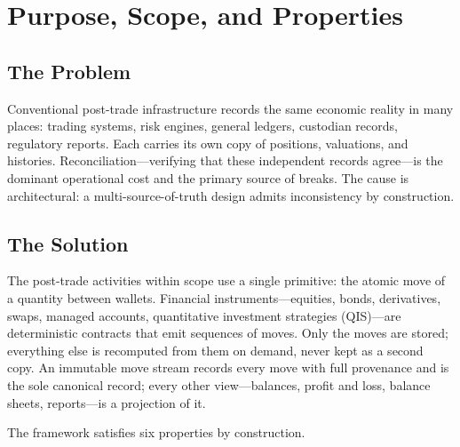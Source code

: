 \section{Purpose, Scope, and Properties}
\label{sec:sec01}
\label{sec:intro}

\subsection{The Problem}

Conventional post-trade infrastructure records the same economic reality in many places: trading systems, risk engines, general ledgers, custodian records, regulatory reports. Each carries its own copy of positions, valuations, and histories. Reconciliation---verifying that these independent records agree---is the dominant operational cost and the primary source of breaks. The cause is architectural: a multi-source-of-truth design admits inconsistency by construction.

\subsection{The Solution}

The post-trade activities within scope use a single primitive: the atomic move of a quantity between wallets. Financial instruments---equities, bonds, derivatives, swaps, managed accounts, quantitative investment strategies (QIS)---are deterministic contracts that emit sequences of moves. Only the moves are stored; everything else is recomputed from them on demand, never kept as a second copy. An immutable move stream records every move with full provenance and is the sole canonical record; every other view---balances, profit and loss, balance sheets, reports---is a projection of it.

The framework satisfies six properties by construction.

